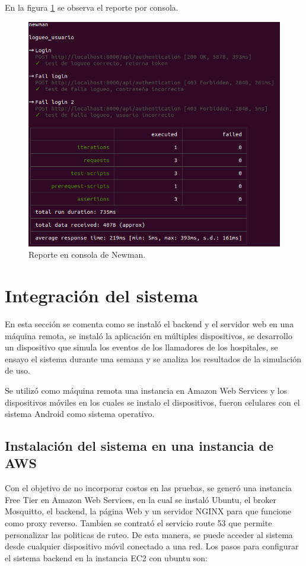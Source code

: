 En la figura \ref{fig:reporte cli Newman} se observa el reporte por consola.
\begin{figure}[ht]
	\centering
	\includegraphics[scale=.32]{./Figures/newman-1.png}
	\caption{Reporte en consola de Newman.}
	\label{fig:reporte cli Newman}
\end{figure}




\pagebreak

\section{Integración del sistema}
\label{Integración del sistema}

En esta sección se comenta como se instaló el backend y el servidor web en una máquina remota, se instaló la aplicación en múltiples dispositivos, se desarrollo un dispositivo que simula los eventos de los llamadores de los hospitales, se ensayo el sistema durante una semana y se analiza los resultados de la simulación de uso.

Se utilizó como máquina remota una instancia en Amazon Web Services y los dispositivos móviles en los cuales se instalo el dispositivos, fueron celulares con el sistema Android como sistema operativo.

\subsection{Instalación del sistema en una instancia de AWS}
Con el objetivo de no incorporar costos en las pruebas, se generó una instancia Free Tier en Amazon Web Services, en la cual se instaló Ubuntu, el broker Mosquitto, el backend, la página Web y un servidor NGINX para que funcione como proxy reverso. Tambien se contrató el servicio route 53 que permite personalizar las politicas de ruteo.
De esta manera, se puede acceder al sistema desde cualquier dispositivo móvil conectado a una red.
Los pasos para configurar el sistema backend en la instancia EC2 con ubuntu son:
\pagebreak

